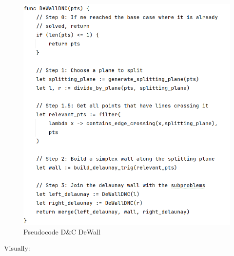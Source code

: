 \begin{figure}[H]
    \centering
    \includegraphics[width=\textwidth]{pseudocode_dnc_dewall.PNG}
    \caption{Pseudocode D\&C DeWall}
    \label{fig:my_label}
\end{figure}
\newpage
Visually:

